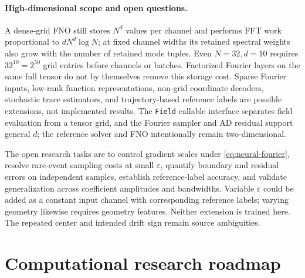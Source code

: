 \documentclass[12pt,a4paper,oneside]{book}
\begin{document}
\paragraph{High-dimensional scope and open questions.}
A dense-grid FNO still stores $N^d$ values per channel and performs FFT work proportional to
$dN^d\log N$; at fixed channel widths its retained spectral weights also grow with the number of retained mode
tuples. Even $N=32,d=10$ requires $32^{10}=2^{50}$ grid entries before channels or batches.
Factorized Fourier layers on the same full tensor do not by themselves remove this storage cost.
Sparse Fourier inputs, low-rank function representations, non-grid coordinate decoders, stochastic trace estimators,
and trajectory-based reference labels are possible extensions, not implemented results. The \texttt{Field} callable
interface separates field evaluation from a tensor grid, and the Fourier sampler and AD residual support general $d$;
the reference solver and FNO intentionally remain two-dimensional.

The open research tasks are to control gradient scales under \eqref{eq:neural-fourier}, resolve rare-event sampling
costs at small $\varepsilon$, quantify boundary and residual errors on independent samples, establish reference-label
accuracy, and validate generalization across coefficient amplitudes and bandwidths. Variable $\varepsilon$ could be
added as a constant input channel with corresponding reference labels; varying geometry likewise requires geometry
features. Neither extension is trained here. The repeated center and intended drift sign remain source ambiguities.

\section{Computational research roadmap}
\label{subsec:neural-roadmap}
\end{document}
